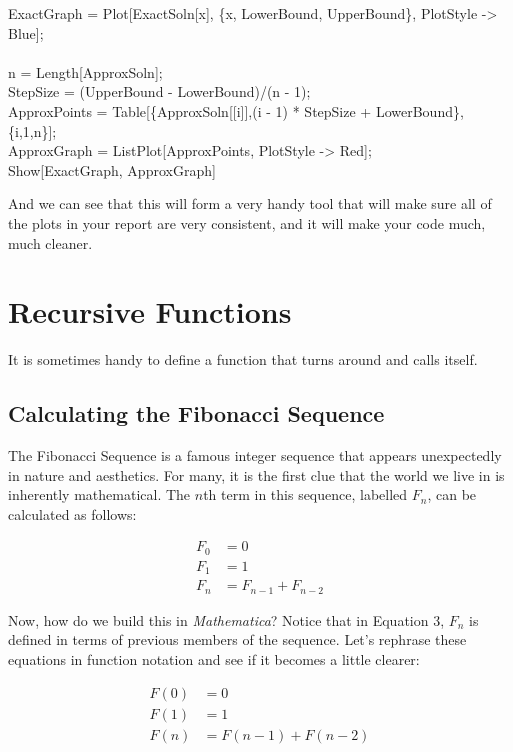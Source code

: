 \begin{code}
	   ExactGraph = Plot[ExactSoln[x], \{x, LowerBound, UpperBound\}, PlotStyle -> Blue];\\
	   \\
	   n = Length[ApproxSoln];\\
	   StepSize = (UpperBound - LowerBound)/(n - 1);\\
	   ApproxPoints = Table[\{ApproxSoln[[i]],(i - 1) * StepSize + LowerBound\},\{i,1,n\}];\\
	   ApproxGraph = ListPlot[ApproxPoints, PlotStyle -> Red];\\
	   Show[ExactGraph, ApproxGraph]
\end{code}

And we can see that this will form a very handy tool that will make sure all of the plots in your report are very consistent, and it will make your code much, much cleaner.

\section{Recursive Functions}

It is sometimes handy to define a function that turns around and calls itself.

\subsection{Calculating the Fibonacci Sequence}

The Fibonacci Sequence is a famous integer sequence that appears unexpectedly in nature and aesthetics. For many, it is the first clue that the world we live in is inherently mathematical. The $n$th term in this sequence, labelled $F_n$, can be calculated as follows:

\begin{align}
	   F_0 &= 0 \\
	   F_1 &= 1 \\
	   F_n &= F_{n - 1} + F_{n - 2}
\end{align}

Now, how do we build this in \emph{Mathematica}? Notice that in Equation 3, $F_n$ is defined in terms of previous members of the sequence. Let's rephrase these equations in function notation and see if it becomes a little clearer:

\begin{align}
	   F(0) &= 0 \\
	   F(1) &= 1 \\
	   F(n) &= F(n - 1) + F(n - 2)
\end{align}

